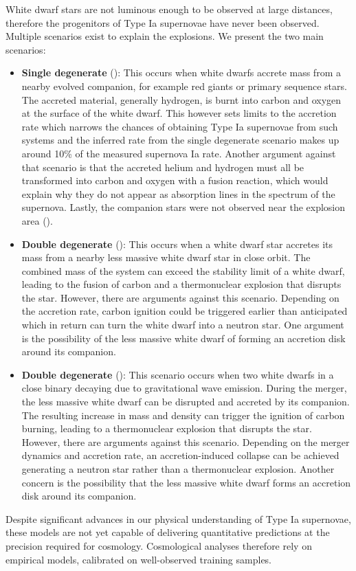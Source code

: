 White dwarf stars are not luminous enough to be observed at large distances, therefore the progenitors of Type Ia 
supernovae have never been observed. Multiple scenarios exist to explain the explosions. We present the two main scenarios:
\begin{itemize}
    \item \textbf{Single degenerate} (\cite{Nomoto_1982}): This occurs when white dwarfs accrete mass from a nearby evolved companion, for example red giants or primary sequence stars. 
The accreted material, generally hydrogen, is burnt into carbon and oxygen at the surface of the white dwarf. This however sets limits to the accretion rate which narrows 
the chances of obtaining Type Ia supernovae from such systems and the inferred rate from the single degenerate scenario makes up around 10\% of the measured supernova Ia rate. 
Another argument against that scenario is that the accreted helium and hydrogen must all be transformed into carbon and oxygen with a fusion reaction, 
which would explain why they do not appear as absorption lines in the spectrum of the supernova. Lastly, the companion stars 
were not observed near the explosion area (\cite{Li_2011}).
    \item \textbf{Double degenerate} (\cite{Iben_1984}): This occurs when a white dwarf star accretes its mass from a nearby less massive white dwarf star in close orbit.
    The combined mass of the system can exceed the stability limit of a white dwarf, leading to the fusion of carbon and a thermonuclear explosion that disrupts 
    the star. However, there are arguments against this scenario. Depending on the accretion rate, carbon ignition could be triggered earlier than anticipated which 
    in return can turn the white dwarf into a neutron star. 
    One argument is the possibility of the less massive white dwarf of forming an accretion disk around 
    its companion. 
    \item \textbf{Double degenerate} (\cite{Iben_1984}): This scenario occurs when two white dwarfs in a close binary 
    decaying due to gravitational wave emission. 
    During the merger, the less massive white dwarf can be disrupted and accreted by its companion. The resulting increase 
    in mass and density can trigger the ignition of carbon burning, leading to a thermonuclear explosion that disrupts the star. However, there are arguments 
    against this scenario. Depending on the merger dynamics and accretion rate, 
    an accretion-induced collapse can be achieved generating a neutron star rather than a thermonuclear explosion. Another concern is the possibility that the less massive 
    white dwarf forms an accretion disk around its companion.
\end{itemize}
Despite significant advances in our physical understanding of Type Ia 
supernovae, these models are not yet capable of delivering 
quantitative predictions at the precision required for cosmology. 
Cosmological analyses therefore rely on empirical models, calibrated 
on well-observed training samples.

